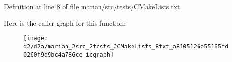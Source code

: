 Definition at line 8 of file marian/src/tests/\+C\+Make\+Lists.\+txt.




Here is the caller graph for this function\+:
\nopagebreak
\begin{figure}[H]
\begin{center}
\leavevmode
\texttt{[image: d2/d2a/marian\_2src\_2tests\_2CMakeLists\_8txt\_a8105126e55165fd0260f9d9bc4a786ce\_icgraph]}
\end{center}
\end{figure}


